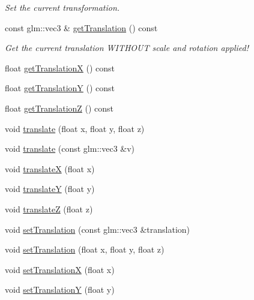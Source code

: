 \begin{DoxyCompactItemize}
\begin{DoxyCompactList}\small\item\em Set the current transformation. \end{DoxyCompactList}\item 
const glm\+::vec3 \& \mbox{\hyperlink{classec_1_1_transform3_d_a73b5f3bfbeb73eb4f445b1941b8e359d}{get\+Translation}} () const
\begin{DoxyCompactList}\small\item\em Get the current translation W\+I\+T\+H\+O\+UT scale and rotation applied! \end{DoxyCompactList}\item 
float \mbox{\hyperlink{classec_1_1_transform3_d_ac0371b75ed67d59665967846d9cc6827}{get\+TranslationX}} () const
\item 
float \mbox{\hyperlink{classec_1_1_transform3_d_a18d2aca82a3b8944815801963f32ab8c}{get\+TranslationY}} () const
\item 
float \mbox{\hyperlink{classec_1_1_transform3_d_a5d7ec019acf68cb930db1a7db79ef97f}{get\+TranslationZ}} () const
\item 
void \mbox{\hyperlink{classec_1_1_transform3_d_a9c143bdc0bf020940b9b6bd7e2a01d45}{translate}} (float x, float y, float z)
\item 
void \mbox{\hyperlink{classec_1_1_transform3_d_ae0290297c16ee5ce4f6cf2855fd26aa0}{translate}} (const glm\+::vec3 \&v)
\item 
void \mbox{\hyperlink{classec_1_1_transform3_d_a6e8e6da470c6a080b669cd619e8554ef}{translateX}} (float x)
\item 
void \mbox{\hyperlink{classec_1_1_transform3_d_ab0c9d7ff73b744c480914b7d2aaabf81}{translateY}} (float y)
\item 
void \mbox{\hyperlink{classec_1_1_transform3_d_a13ea4d1c69ec17c2ce4c1d8b4068639a}{translateZ}} (float z)
\item 
void \mbox{\hyperlink{classec_1_1_transform3_d_a2866183fe28eb5e5360d156830b00655}{set\+Translation}} (const glm\+::vec3 \&translation)
\item 
void \mbox{\hyperlink{classec_1_1_transform3_d_a2671c96409a11a74d9c7cb96d96b274b}{set\+Translation}} (float x, float y, float z)
\item 
void \mbox{\hyperlink{classec_1_1_transform3_d_a51d65455864ed3595a53c40d2f576067}{set\+TranslationX}} (float x)
\item 
void \mbox{\hyperlink{classec_1_1_transform3_d_aa9d5eab59374d5e900c17c02a4c64b2f}{set\+TranslationY}} (float y)
\item 

\end{DoxyCompactItemize}
